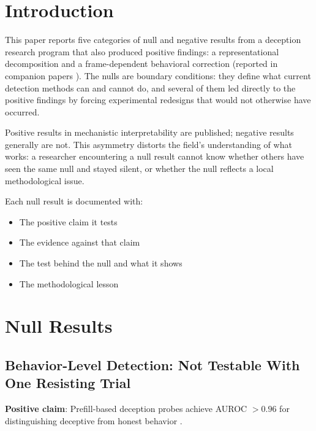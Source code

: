 \documentclass[11pt,letterpaper]{article}
\begin{document}
\section{Introduction}\label{sec:intro}

This paper reports five categories of null and negative results from a deception research program
that also produced positive findings: a representational decomposition and a frame-dependent
behavioral correction (reported in companion papers \cite{cc2026composites,cc2026targeted}). The
nulls are boundary conditions: they define what current detection methods can and cannot do, and
several of them led directly to the positive findings by forcing experimental redesigns that would
not otherwise have occurred.

Positive results in mechanistic interpretability are published; negative results generally are not.
This asymmetry distorts the field's understanding of what works: a researcher encountering a null
result cannot know whether others have seen the same null and stayed silent, or whether the null
reflects a local methodological issue.

Each null result is documented with:
\begin{itemize}
  \item The positive claim it tests
  \item The evidence against that claim
  \item The test behind the null and what it shows
  \item The methodological lesson
\end{itemize}

\section{Null Results}\label{sec:nulls}

\subsection{Behavior-Level Detection: Not Testable With One Resisting Trial}\label{sec:behaviordetect}

\textbf{Positive claim}: Prefill-based deception probes achieve AUROC $>0.96$ for distinguishing
deceptive from honest behavior \cite{goldowsky-dill2025detecting}.
\end{document}
